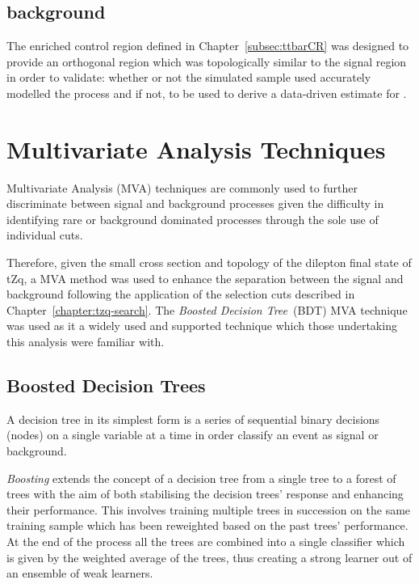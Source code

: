 \subsection{\ttbar background}\label{subsec:ttbarEstimation}
The \ttbar enriched control region defined in Chapter~\ref{subsec:ttbarCR} was designed to provide an orthogonal region which was topologically similar to the signal region in order to validate:
 whether or not the simulated \ttbar sample used accurately modelled the \ttbar process
 and if not, to be used to derive a data-driven estimate for \ttbar.



\section{Multivariate Analysis Techniques}\label{sec:mvas}
Multivariate Analysis (MVA) techniques are commonly used to further discriminate between signal and background processes given the difficulty in identifying rare or background dominated processes through the sole use of individual cuts.

Therefore, given the small cross section and topology of the dilepton final state of tZq, a MVA method was used to enhance the separation between the signal and background following the application of the selection cuts described in Chapter~\ref{chapter:tzq-search}.
The \emph{Boosted Decision Tree}~(BDT) MVA technique was used as it a widely used and supported technique which those undertaking this analysis were familiar with.

\subsection{Boosted Decision Trees}\label{subsec:bdt}
A decision tree in its simplest form is a series of sequential binary decisions (nodes) on a single variable at a time in order classify an event as signal or background.

\emph{Boosting} extends the concept of a decision tree from a single tree to a forest of trees with the aim of both stabilising the decision trees' response and enhancing their performance.
This involves training multiple trees in succession on the same training sample which has been reweighted based on the past trees' performance.
At the end of the process all the trees are combined into a single classifier which is given by the weighted average of the trees, thus creating a strong learner out of an ensemble of weak learners.

